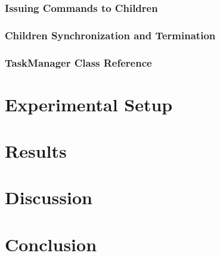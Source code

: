 \documentclass[11pt]{article}
\begin{document}
			\subsubsection{Issuing Commands to Children}
				
			
			\subsubsection{Children Synchronization and Termination}
		
			\subsubsection{TaskManager Class Reference}

	\section{Experimental Setup}
	\section{Results}
	\section{Discussion}
	\section{Conclusion}
\end{document}
